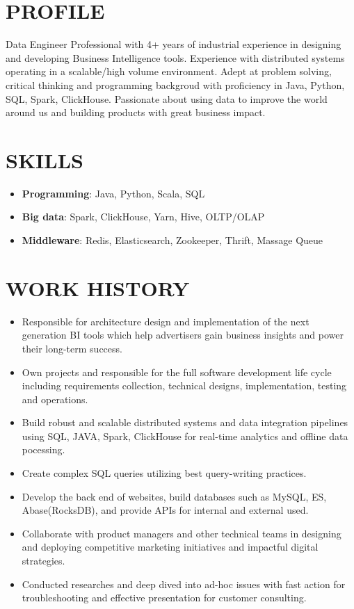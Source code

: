 \documentclass{resume}
\begin{document}

 
\section{PROFILE}
Data Engineer Professional with 4+ years of industrial experience in designing and developing Business Intelligence tools.
Experience with distributed systems operating in a scalable/high volume environment.
Adept at problem solving, critical thinking and programming backgroud with proficiency in Java, Python, SQL, Spark, ClickHouse.
Passionate about using data to improve the world around us and building products with great business impact.

\section{SKILLS}
\begin{itemize}[parsep=0.2ex]
  \item \textbf{Programming}: Java, Python, Scala, SQL
  \item \textbf{Big data}: Spark, ClickHouse, Yarn, Hive, OLTP/OLAP
  \item \textbf{Middleware}: Redis, Elasticsearch, Zookeeper, Thrift, Massage Queue
\end{itemize}

\section{WORK HISTORY}
\begin{itemize}
  \item Responsible for architecture design and implementation of the next generation BI tools 
  which help advertisers gain business insights and power their long-term success.
  \item Own projects and responsible for the full software development life cycle 
  including requirements collection, technical designs, implementation, testing and operations.
  \item Build robust and scalable distributed systems and data integration pipelines 
  using SQL, JAVA, Spark, ClickHouse for real-time analytics and offline data pocessing. 
  \item Create complex SQL queries utilizing best query-writing practices.
  \item Develop the back end of websites, build databases such as MySQL, ES, Abase(RocksDB), and provide APIs for internal and external used.
  \item Collaborate with product managers and other technical teams in designing and deploying competitive marketing initiatives and impactful digital strategies.
  \item Conducted researches and deep dived into ad-hoc issues with fast action for troubleshooting and effective presentation for customer consulting.
  
\end{itemize}
\end{document}
